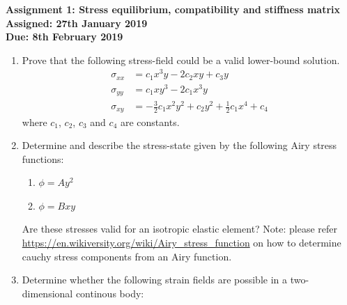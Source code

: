 \documentclass[a4paper,12pt]{article}
\begin{document}
\begin{centering}
	\textbf{
		Assignment 1: Stress equilibrium, compatibility and stiffness matrix\\
		Assigned: 27th January 2019\\
		Due: 8th February 2019\\
	}
\end{centering}

\vspace{1em}
 
\begin{enumerate}
	\item Prove that the following stress-field could be a valid lower-bound solution.
	\begin{align*}
		\sigma_{xx} & = c_1 x^3 y - 2c_2 xy + c_3 y\\
		\sigma_{yy} & = c_1 x y^3 - 2c_1 x^3 y\\
		\sigma_{xy} & = -\frac{3}{2}c_1x^2y^2 + c_2 y^2 + \frac{1}{2}c_1 x^4 + c_4
	\end{align*}
	where $c_1$, $c_2$, $c_3$ and $c_4$ are constants.

	\item Determine and describe the stress-state given by the following Airy stress functions:
	\begin{enumerate}
		\item $\phi = Ay^2$ 
		\item $\phi = Bxy$
	\end{enumerate}
	Are these stresses valid for an isotropic elastic element? Note: please refer \url{https://en.wikiversity.org/wiki/Airy_stress_function} on how to determine cauchy stress components from an Airy function.

	\item Determine whether the following strain fields are possible in a two-dimensional continous body:
	

\end{enumerate}
\end{document}
